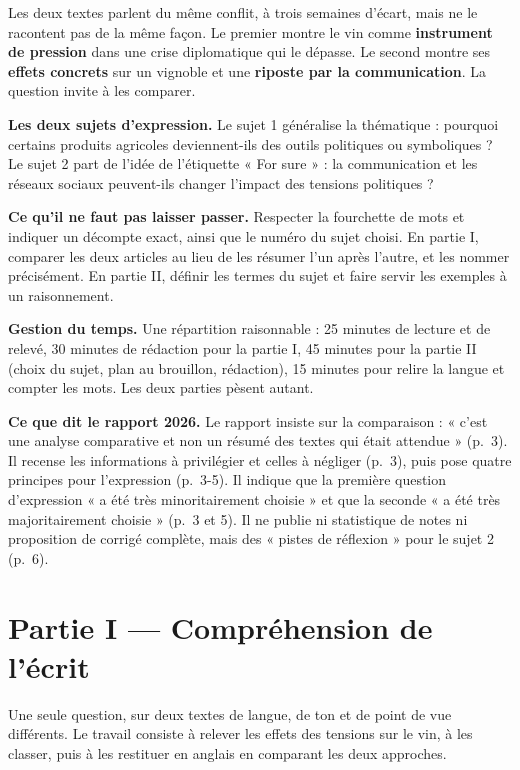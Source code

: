 \documentclass[11pt,a4paper]{article}
\begin{document}
Les deux textes parlent du même conflit, à trois semaines d'écart, mais ne le racontent pas de la même façon. Le premier montre le vin comme \textbf{instrument de pression} dans une crise diplomatique qui le dépasse. Le second montre ses \textbf{effets concrets} sur un vignoble et une \textbf{riposte par la communication}. La question invite à les comparer.

\textbf{Les deux sujets d'expression.} Le sujet 1 généralise la thématique : pourquoi certains produits agricoles deviennent-ils des outils politiques ou symboliques ? Le sujet 2 part de l'idée de l'étiquette « For sure » : la communication et les réseaux sociaux peuvent-ils changer l'impact des tensions politiques ?

\textbf{Ce qu'il ne faut pas laisser passer.} Respecter la fourchette de mots et indiquer un décompte exact, ainsi que le numéro du sujet choisi. En partie I, comparer les deux articles au lieu de les résumer l'un après l'autre, et les nommer précisément. En partie II, définir les termes du sujet et faire servir les exemples à un raisonnement.

\textbf{Gestion du temps.} Une répartition raisonnable : 25 minutes de lecture et de relevé, 30 minutes de rédaction pour la partie I, 45 minutes pour la partie II (choix du sujet, plan au brouillon, rédaction), 15 minutes pour relire la langue et compter les mots. Les deux parties pèsent autant.

\textbf{Ce que dit le rapport 2026.} Le rapport insiste sur la comparaison : « c'est une analyse comparative et non un résumé des textes qui était attendue » (p.~3). Il recense les informations à privilégier et celles à négliger (p.~3), puis pose quatre principes pour l'expression (p.~3-5). Il indique que la première question d'expression « a été très minoritairement choisie » et que la seconde « a été très majoritairement choisie » (p.~3 et 5). Il ne publie ni statistique de notes ni proposition de corrigé complète, mais des « pistes de réflexion » pour le sujet 2 (p.~6).

\hypertarget{partie-i-compruxe9hension-de-luxe9crit}{%
\section{Partie I --- Compréhension de l'écrit}\label{partie-i-compruxe9hension-de-luxe9crit}}

Une seule question, sur deux textes de langue, de ton et de point de vue différents. Le travail consiste à relever les effets des tensions sur le vin, à les classer, puis à les restituer en anglais en comparant les deux approches.
\end{document}
